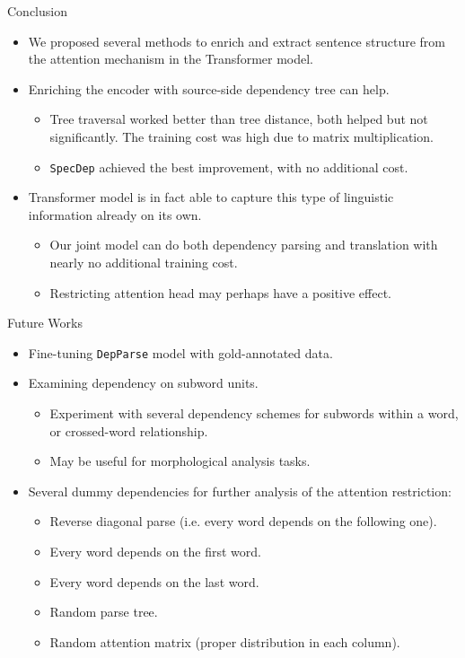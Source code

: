 \documentclass{beamer}
\def\transformer{Transformer\xspace}
\def\DepParse{\texttt{DepParse}\xspace}
\def\SpecDep{\texttt{SpecDep}\xspace}
\begin{document}
\begin{frame}{Conclusion}
\begin{itemize}
    \item We proposed several methods to enrich and extract sentence structure from the attention mechanism in the Transformer model.
    
    \item Enriching the encoder with source-side dependency tree can help.
    \begin{itemize}
        \item Tree traversal worked better than tree distance, both helped but not significantly. The training cost was high due to matrix multiplication.
        \item \SpecDep achieved the best improvement, with no additional cost.
    \end{itemize}
    
    \item \transformer model is in fact able to capture this type of linguistic information already on its own.
    \begin{itemize}
        \item Our joint model can do both dependency parsing and translation with nearly no additional training cost.
        \item Restricting attention head may perhaps have a positive effect.
    \end{itemize}
\end{itemize}
\end{frame}


\begin{frame}{Future Works}
    \begin{itemize}
        \item Fine-tuning \DepParse model with gold-annotated data.
        \item Examining dependency on subword units.
        \begin{itemize}
            \item Experiment with several dependency schemes for subwords within a word, or crossed-word relationship.
            \item May be useful for morphological analysis tasks.
        \end{itemize}
        \item Several dummy dependencies for further analysis of the attention restriction:
        \begin{itemize}
            \item Reverse diagonal parse (i.e. every word depends on the following one).
            \item Every word depends on the first word.
            \item Every word depends on the last word.
            \item Random parse tree.
            \item Random attention matrix (proper distribution in each column).
        \end{itemize}
    \end{itemize}
\end{frame}
\end{document}
